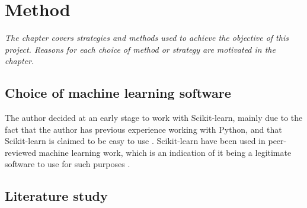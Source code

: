 \chapter{Method}
\emph{The chapter covers strategies and methods used to achieve the objective of this project. Reasons for each choice of method or strategy are motivated in the chapter.}




\section{Choice of machine learning software} \label{sec:choice_ml}
	The author decided at an early stage to work with Scikit-learn, mainly due to the fact that the author has previous experience working with Python, and that Scikit-learn is claimed to be easy to use \cite{WEBSITE:27}. Scikit-learn have been used in peer-reviewed machine learning work, which is an indication of it being a legitimate software to use for such purposes \cite{ARTICLE:26, ARTICLE:27}.  

\section{Literature study} \label{sec:literature_study}

